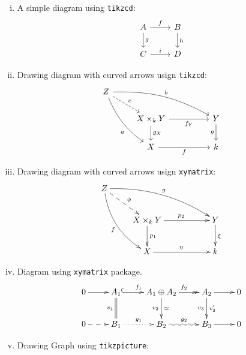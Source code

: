 \documentclass[11pt,a4paper,leqno]{article}
\numberwithin{equation}{subsection}
\theoremstyle{definition}
\begin{document}
\begin{enumerate}[(i)]
	\item A simple diagram using \texttt{tikzcd}:  
	\begin{equation}
	\begin{tikzcd}
	A \ar{r}{f} \ar{d}{g} & B \ar{d}{h} \\ 
	C \ar{r}{i} & D
	\end{tikzcd}
	\end{equation}
	
	\item Drawing diagram with curved arrows usign \texttt{tikzcd}: 
	\begin{equation}
		\begin{gathered}
			\begin{tikzcd}
			Z \arrow[bend right=15]{rdd}[below=8]{a} \arrow[bend left=15]{rrrd}{b} \ar[dashed]{rd}{c} \\
			& X \times_k Y \ar{rr}[below]{f_Y} \ar{d}{g_X} && Y \ar{d}[left]{g} \\
			& X \ar{rr}[below]{f} && k
			\end{tikzcd}
		\end{gathered}
	\end{equation}
	
	\item Drawing diagram with curved arrows usign \texttt{xymatrix}: 
	\begin{equation}
		\begin{gathered}
		\xymatrix{
			Z \ar@/_1pc/[ddr]_f \ar@{-->}[dr]^\phi \ar@/^1pc/[drrr]^g & & & \\ 
			& X \times_k Y \ar[rr]^{p_2} \ar[d]^{p_1} & & Y \ar[d]^\xi \\ 
			& X \ar[rr]^\eta & & k
		}
		\end{gathered}
	\end{equation}
	
	
	\item Diagram using \texttt{xymatrix} package. 
	\begin{equation}
	\begin{gathered}
	\xymatrix{
		0 \ar[r] & A_1 \ar@{^(->}[r]^{f_1} \ar@{=}[d]_{v_1} & A_1\oplus A_2 \ar@{->>}[r]^{f_2}\ar[d]_{v_2}^{\simeq} 
		& A_2 \ar[r] \ar[d]_{v_3}^{v_3'} & 0 \\ 
		0 \ar@{-->}[r] & B_1 \ar@{..>}[r]^{g_1} & B_2 \ar@{~>}[r]^{g_2} & B_3 \ar[r] & 0 
	}
	\end{gathered}
	\end{equation}
	
	\item Drawing Graph using \texttt{tikzpicture}: 
	\begin{center}
\end{center}
\end{enumerate}
\end{document}
